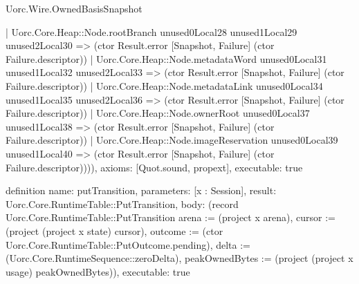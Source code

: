 \begin{lexlean}{Uorc.Wire.OwnedBasisSnapshot}
\begin{semanticmodule}
{      | Uorc.Core.Heap::Node.rootBranch unused0Local28 unused1Local29 unused2Local30 => (ctor Result.error [Snapshot, Failure] (ctor Failure.descriptor))
      | Uorc.Core.Heap::Node.metadataWord unused0Local31 unused1Local32 unused2Local33 => (ctor Result.error [Snapshot, Failure] (ctor Failure.descriptor))
      | Uorc.Core.Heap::Node.metadataLink unused0Local34 unused1Local35 unused2Local36 => (ctor Result.error [Snapshot, Failure] (ctor Failure.descriptor))
      | Uorc.Core.Heap::Node.ownerRoot unused0Local37 unused1Local38 => (ctor Result.error [Snapshot, Failure] (ctor Failure.descriptor))
      | Uorc.Core.Heap::Node.imageReservation unused0Local39 unused1Local40 => (ctor Result.error [Snapshot, Failure] (ctor Failure.descriptor)))),
  axioms: [Quot.sound, propext],
  executable: true
}

definition{
  name: putTransition,
  parameters: [x : Session],
  result: Uorc.Core.RuntimeTable::PutTransition,
  body: (record Uorc.Core.RuntimeTable::PutTransition {arena := (project x arena), cursor := (project (project x state) cursor), outcome := (ctor Uorc.Core.RuntimeTable::PutOutcome.pending), delta := (Uorc.Core.RuntimeSequence::zeroDelta), peakOwnedBytes := (project (project x usage) peakOwnedBytes)}),
  executable: true
}


\end{semanticmodule}
\end{lexlean}
